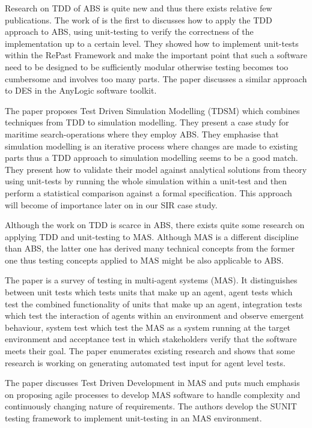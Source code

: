 Research on TDD of ABS is quite new and thus there exists relative few publications. The work of \cite{collier_test-driven_2013} is the first to discusses how to apply the TDD approach to ABS, using unit-testing to verify the correctness of the implementation up to a certain level. They showed how to implement unit-tests within the RePast Framework and make the important point that such a software need to be designed to be sufficiently modular otherwise testing becomes too cumbersome and involves too many parts. The paper \cite{asta_investigation_2014} discusses a similar approach to DES in the AnyLogic software toolkit. 

The paper \cite{onggo_test-driven_2016} proposes Test Driven Simulation Modelling (TDSM) which combines techniques from TDD to simulation modelling. They present a case study for maritime search-operations where they employ ABS. They emphasise that simulation modelling is an iterative process where changes are made to existing parts thus a TDD approach to simulation modelling seems to be a good match. They present how to validate their model against analytical solutions from theory using unit-tests by running the whole simulation within a unit-test and then perform a statistical comparison against a formal specification. This approach will become of importance later on in our SIR case study.

Although the work on TDD is scarce in ABS, there exists quite some research on applying TDD and unit-testing to MAS. Although MAS is a different discipline than ABS, the latter one has derived many technical concepts from the former one thus testing concepts applied to MAS might be also applicable to ABS. 

The paper \cite{nguyen_testing_2011} is a survey of testing in multi-agent systems (MAS). It distinguishes between unit tests which tests units that make up an agent, agent tests which test the combined functionality of units that make up an agent, integration tests which test the interaction of agents within an environment and observe emergent behaviour, system test which test the MAS as a system running at the target environment and acceptance test in which stakeholders verify that the software meets their goal. The paper enumerates existing research and shows that some research is working on generating automated test input for agent level tests.

The paper \cite{tiryaki_sunit:_2007} discusses Test Driven Development in MAS and puts much emphasis on proposing agile processes to develop MAS software to handle complexity and continuously changing nature of requirements. The authors develop the SUNIT testing framework to implement unit-testing in an MAS environment.

